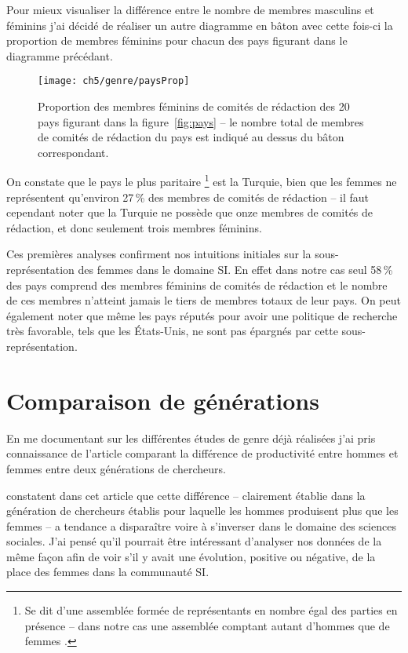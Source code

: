 		Pour mieux visualiser la différence entre le nombre de membres masculins et féminins j’ai décidé de réaliser un autre diagramme en bâton avec cette fois-ci la proportion de membres féminins pour chacun des pays figurant dans le diagramme précédant.
			
		\begin{figure}[p]
			\centering
			\texttt{[image: ch5/genre/paysProp]}
			\caption{Proportion des membres féminins de comités de rédaction des 20
pays figurant dans la figure~\ref{fig:pays} -- le nombre total de membres de comités de rédaction du pays est indiqué au dessus du bâton correspondant.}\label{fig:paysProp}
		\end{figure}
		
		On constate que le pays le plus paritaire \footnote{Se dit d’une assemblée formée de représentants en nombre égal des parties en présence -- dans notre cas une assemblée comptant autant d’hommes que de femmes \citep{larousse}.} est la Turquie, bien que les femmes ne représentent qu’environ 27\,\% des membres de comités de rédaction -- il faut cependant noter que la Turquie ne possède que onze membres de comités de rédaction, et donc seulement trois membres féminins.
			
		Ces premières analyses confirment nos intuitions initiales sur la sous-représentation des femmes dans le domaine SI. En effet dans notre cas seul 58\,\% des pays comprend des membres féminins de comités de rédaction et le nombre de ces membres n'atteint jamais le tiers de membres totaux de leur pays. On peut également noter que même les pays réputés pour avoir une politique de recherche très favorable, tels que les États-Unis, ne sont pas épargnés par cette sous-représentation.


	\section{Comparaison de générations}
		En me documentant sur les différentes études de genre déjà réalisées j'ai pris connaissance de l'article \citep*{van} comparant la différence de productivité entre hommes et femmes entre deux générations de chercheurs.
		
		\citet*{van} constatent dans cet article que cette différence -- clairement établie dans la génération de chercheurs établis pour laquelle les hommes produisent plus que les femmes -- a tendance a disparaître voire à s'inverser dans le domaine des sciences sociales. J'ai pensé qu'il pourrait être intéressant d'analyser nos données de la même façon afin de voir s'il y avait une évolution, positive ou négative, de la place des femmes dans la communauté SI.
	
